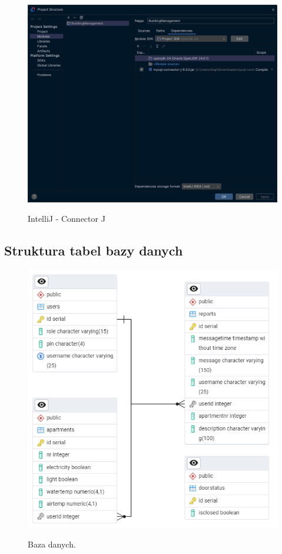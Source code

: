 \begin{figure}[H]
    \centering
    \includegraphics[width=\linewidth]{figures/project-struct.png}\\
    \caption{IntelliJ - Connector J\label{fig3}}
\end{figure}

\subsection{Struktura tabel bazy danych}

\begin{figure}[H]
    \centering
    \includegraphics[width=\linewidth]{figures/database.png}\\
    \caption{Baza danych.\label{fig4}}
\end{figure}

